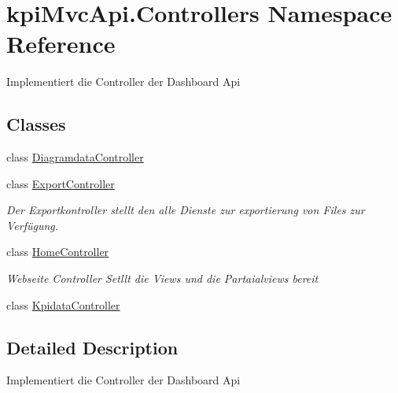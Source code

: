 \hypertarget{namespacekpi_mvc_api_1_1_controllers}{}\section{kpi\+Mvc\+Api.\+Controllers Namespace Reference}
\label{namespacekpi_mvc_api_1_1_controllers}


Implementiert die Controller der Dashboard Api  


\subsection*{Classes}
\begin{DoxyCompactItemize}
\item 
class \hyperlink{classkpi_mvc_api_1_1_controllers_1_1_diagramdata_controller}{Diagramdata\+Controller}
\item 
class \hyperlink{classkpi_mvc_api_1_1_controllers_1_1_export_controller}{Export\+Controller}
\begin{DoxyCompactList}\small\item\em Der Exportkontroller stellt den alle Dienste zur exportierung von Files zur Verfügung. \end{DoxyCompactList}\item 
class \hyperlink{classkpi_mvc_api_1_1_controllers_1_1_home_controller}{Home\+Controller}
\begin{DoxyCompactList}\small\item\em Webseite Controller Setllt die Views und die Partaialviews bereit \end{DoxyCompactList}\item 
class \hyperlink{classkpi_mvc_api_1_1_controllers_1_1_kpidata_controller}{Kpidata\+Controller}
\end{DoxyCompactItemize}


\subsection{Detailed Description}
Implementiert die Controller der Dashboard Api 

